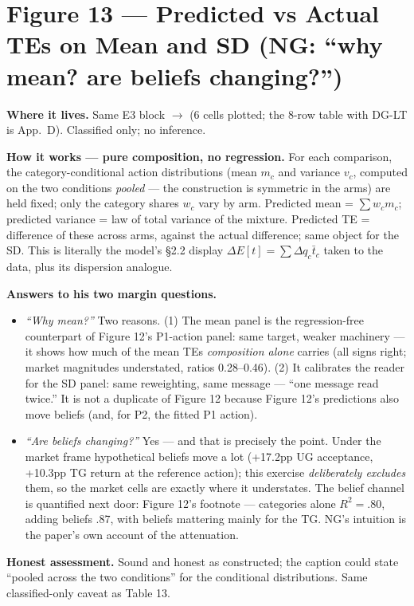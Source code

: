 \documentclass[11pt]{article}
\newcommand{\code}[1]{\path{#1}}
\begin{document}
\section{Figure 13 --- Predicted vs Actual TEs on Mean and SD (NG: ``why mean? are beliefs changing?'')}

\textbf{Where it lives.} Same E3 block $\to$ \code{heterogeneity_predicted_actual.png} (6 cells plotted; the 8-row table with DG-LT is App.~D). Classified only; no inference.

\textbf{How it works --- pure composition, no regression.} For each comparison, the category-conditional action distributions (mean $m_c$ and variance $v_c$, computed on the two conditions \emph{pooled} --- the construction is symmetric in the arms) are held fixed; only the category shares $w_c$ vary by arm. Predicted mean = $\sum w_c m_c$; predicted variance = law of total variance of the mixture. Predicted TE = difference of these across arms, against the actual difference; same object for the SD. This is literally the model's \S2.2 display $\Delta E[t] = \sum \Delta q_c \bar t_c$ taken to the data, plus its dispersion analogue.

\textbf{Answers to his two margin questions.}
\begin{itemize}
\item \emph{``Why mean?''} Two reasons. (1) The mean panel is the regression-free counterpart of Figure 12's P1-action panel: same target, weaker machinery --- it shows how much of the mean TEs \emph{composition alone} carries (all signs right; market magnitudes understated, ratios 0.28--0.46). (2) It calibrates the reader for the SD panel: same reweighting, same message --- ``one message read twice.'' It is not a duplicate of Figure 12 because Figure 12's predictions also move beliefs (and, for P2, the fitted P1 action).
\item \emph{``Are beliefs changing?''} Yes --- and that is precisely the point. Under the market frame hypothetical beliefs move a lot (+17.2pp UG acceptance, +10.3pp TG return at the reference action); this exercise \emph{deliberately excludes} them, so the market cells are exactly where it understates. The belief channel is quantified next door: Figure 12's footnote --- categories alone $R^2=.80$, adding beliefs .87, with beliefs mattering mainly for the TG. NG's intuition is the paper's own account of the attenuation.
\end{itemize}

\textbf{Honest assessment.} Sound and honest as constructed; the caption could state ``pooled across the two conditions'' for the conditional distributions. Same classified-only caveat as Table 13.
\end{document}
